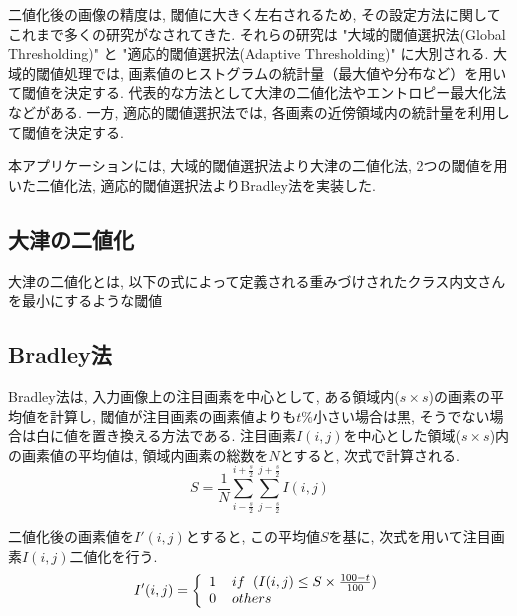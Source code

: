 \documentclass{suribt}
\begin{document}
二値化後の画像の精度は, 閾値に大きく左右されるため, その設定方法に関してこれまで多くの研究がなされてきた\cite{Otsu-1979, Bradley-2007}. それらの研究は "大域的閾値選択法(Global Thresholding)" と "適応的閾値選択法(Adaptive Thresholding)" に大別される. 大域的閾値処理では, 画素値のヒストグラムの統計量（最大値や分布など）を用いて閾値を決定する. 代表的な方法として大津の二値化法やエントロピー最大化法などがある. 一方, 適応的閾値選択法では, 各画素の近傍領域内の統計量を利用して閾値を決定する. 

本アプリケーションには, 大域的閾値選択法より大津の二値化法, 2つの閾値を用いた二値化法, 適応的閾値選択法よりBradley法を実装した. 
\subsection{大津の二値化}
大津の二値化とは, 以下の式によって定義される重みづけされたクラス内文さんを最小にするような閾値

\subsection{Bradley法}
Bradley法は, 入力画像上の注目画素を中心として, ある領域内($s \times s$)の画素の平均値を計算し, 閾値が注目画素の画素値よりも$t\%$小さい場合は黒, そうでない場合は白に値を置き換える方法である. 
注目画素$I(i, j)$を中心とした領域($s \times s$)内の画素値の平均値は, 領域内画素の総数を$N$とすると, 次式で計算される.
\begin{equation}
	S = \frac{1}{N} \sum_{i-\frac{s}{2}}^{i+\frac{s}{2}} \sum_{j-\frac{s}{2}}^{j+\frac{s}{2}} I(i, j)
\end{equation}

二値化後の画素値を$I'(i, j)$とすると, この平均値$S$を基に, 次式を用いて注目画素$I(i, j)$二値化を行う.
\begin{equation}
	I'(i, j) = \left\{
		\begin{array}{l}
			1 \hspace{4mm} if \hspace{2mm} (I(i, j) \leq S \times \frac{100 - t}{100})\\
			0 \hspace{4mm} others
		\end{array}
		\right.
\end{equation}

\end{document}
